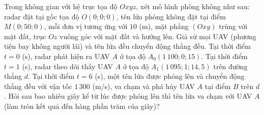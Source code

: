 \begin{bt}%
	Trong không gian với hệ trục tọa độ $Oxyz$, xét mô hình phòng không như sau: radar đặt tại gốc tọa độ $O\left(0;0;0\right)$, tên lửa phòng không đặt tại điểm $M\left(0;50;0\right)$, mỗi đơn vị tương ứng với $10$ (m), mặt phẳng $\left(Oxy\right)$ trùng với mặt đất, trục $Oz$ vuông góc với mặt đất và  hướng lên. Giả sử mọi UAV (phương tiện bay không người lái) và tên lửa đều chuyển động thẳng đều. Tại thời điểm $t=0$ (s), radar phát hiện ra UAV $A$ ở tọa độ $A_0\left(1\,100;0;15\right)$.
	Tại thời điểm $t=1$ (s), radar theo dõi thấy UAV $A$ ở tọa độ $A_1\left(1\,095;1;14{,}5\right)$ trên đường thẳng $d$. Tại thời điểm $t=6$ (s),  một tên lửa được phóng lên và chuyển động thẳng đều với vận tốc $1\,300$ (m/s), va chạm và phá hủy UAV $A$ tại điểm $B$ trên $d$. Hỏi sau bao nhiêu giây kể từ lúc được phóng lên thì tên lửa va chạm với UAV $A$ (làm tròn kết quả đến hàng phần trăm của giây)?
\end{bt}

